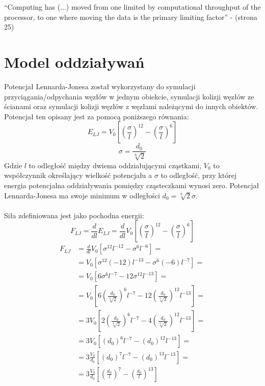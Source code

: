 \documentclass[12pt, letterpaper]{report}
\begin{document}
    ``Computing has (...) moved from one limited by computational throughput of the 
    processor, to one where moving the data is the primary limiting factor'' - \cite{cuda} (strona 25)
    
    \section{Model oddziaływań}
    Potencjał Lennarda-Jonesa został wykorzystany do symulacji przyciągania/odpychania 
    węzłów w jednym obiekcie, symulacji kolizji węzłów ze ścianami oraz symulacji
    kolizji węzłów z węzłami należącymi do innych obiektów. 
    Potencjał ten opisany jest za pomocą poniższego równania:
    \begin{equation}
        E_{LJ} = V_0 \left[ \left( \frac{\sigma}{l} \right)^{12} - \left( \frac{\sigma}{l} \right)^{6} \right]
    \end{equation}
    \begin{equation}
        \sigma = \frac{d_0}{\sqrt[6]{2}}
    \end{equation}
    Gdzie $l$ to odległość między dwiema oddziałującymi cząstkami, $V_0$ to współczynnik określający wielkość potencjału 
    a $\sigma$ to odległość, przy której energia potencjalna oddziaływania pomiędzy cząsteczkami wynosi zero. 
    Potencjał Lennarda-Jonesa ma swoje minimum w odległości $d_0 = \sqrt[6]{2} \sigma$. \\ \\
    Siła zdefiniowana jest jako pochodna energii:
    \begin{equation}
        F_{LJ} = 
        \frac{d}{dl} E_{LJ} = 
        \frac{d}{dl} V_0 \left[ \left( \frac{\sigma}{l} \right)^{12} - \left( \frac{\sigma}{l} \right)^{6} \right]
    \end{equation}
    \begin{align*}
        F_{LJ} &= \frac{d}{dl} V_0 \left[ \sigma^{12}l^{-12} - \sigma^{6}l^{-6} \right] =\\
        &= V_0 \left[ \sigma^{12}(-12)l^{-13} - \sigma^{6}(-6)l^{-7} \right] =\\
        &= V_0 \left[ 6\sigma^{6}l^{-7} - 12\sigma^{12}l^{-13} \right] =\\
        &= V_0 \left[ 6 \left(\frac{d_0}{\sqrt[6]{2}}\right)^{6} l^{-7} - 12 \left(\frac{d_0}{\sqrt[6]{2}}\right)^{12} l^{-13} \right] =\\
        &= 3 V_0 \left[ 2 \left(\frac{d_0}{\sqrt[6]{2}}\right)^{6} l^{-7} - 4 \left(\frac{d_0}{\sqrt[6]{2}}\right)^{12} l^{-13} \right] =\\
        &= 3 V_0 \left[ (d_{0})^{6} l^{-7} - (d_{0})^{12} l^{-13} \right] =\\
        &= 3 \frac{V_0}{d_0} \left[ (d_{0})^{7} l^{-7} - (d_{0})^{13} l^{-13} \right] =\\
        &= 3\frac{V_0}{d_0} \left[ \left(\frac{d_0}{l}\right)^{7} - \left(\frac{d_0}{l}\right)^{13} \right]
    \end{align*}
\end{document}
